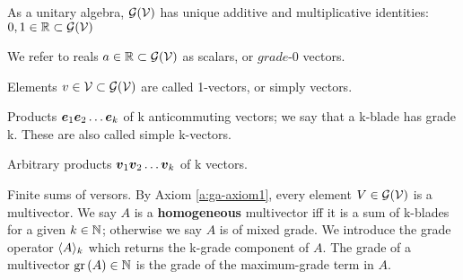 \begin{definition}[Identities]
    As a unitary algebra, $\mathcal{G}(\mathcal{V})$ has unique additive and multiplicative identities: $0, 1 \in \mathbb{R} \subset \mathcal{G}(\mathcal{V})$
\end{definition}
\begin{definition}[Scalars]
    We refer to reals $a \in \mathbb{R} \subset \mathcal{G}(\mathcal{V})$ as scalars, or $\textit{grade-0}$ vectors.
\end{definition}
\begin{definition}[1-vectors]
    Elements $v \in \mathcal{V} \subset \mathcal{G}(\mathcal{V})$ are called 1-vectors, or simply vectors.
\end{definition}
\begin{definition}[k-blades] \label{d:k-blades}
Products $\boldsymbol{e}_1\boldsymbol{e}_2 \ldots \boldsymbol{e}_k$ of k anticommuting vectors; we say that a k-blade has grade k. These are also called simple k-vectors.
\end{definition}
\begin{definition}[k-versors]
Arbitrary products $\boldsymbol{v}_1\boldsymbol{v}_2 \ldots \boldsymbol{v}_k$ of k vectors.
\end{definition}
\begin{definition}[Multivectors]
	Finite sums of versors. By Axiom \ref{a:ga-axiom1}, every element $V \in \mathcal{G}(\mathcal{V})$ is a multivector. We say $A$ is a \textbf{homogeneous} multivector iff it is a sum of k-blades for a given $k \in \mathbb{N}$; otherwise we say $A$ is of mixed grade.
		We introduce the grade operator $\langle A \rangle_{k}$ which returns the k-grade component of $A$.
		The grade of a multivector $\mathrm{gr}\left(A\right) \in \mathbb{N}$ is the grade of the maximum-grade term in $A$.
\end{definition}
